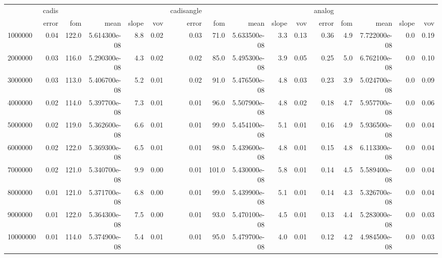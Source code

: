 \begin{tabular}{lrrrrrrrrrrrrrrr}
\toprule
{} & cadis &       &               &       &      & cadisangle &       &               &       &      & analog &     &               &       &      \\
{} & error &   fom &          mean & slope &  vov &      error &   fom &          mean & slope &  vov &  error & fom &          mean & slope &  vov \\
\midrule
1000000  &  0.04 & 122.0 &  5.614300e-08 &   8.8 & 0.02 &       0.03 &  71.0 &  5.633500e-08 &   3.3 & 0.13 &   0.36 & 4.9 &  7.722000e-08 &   0.0 & 0.19 \\
2000000  &  0.03 & 116.0 &  5.290300e-08 &   4.3 & 0.02 &       0.02 &  85.0 &  5.495300e-08 &   3.9 & 0.05 &   0.25 & 5.0 &  6.762100e-08 &   0.0 & 0.10 \\
3000000  &  0.03 & 113.0 &  5.406700e-08 &   5.2 & 0.01 &       0.02 &  91.0 &  5.476500e-08 &   4.8 & 0.03 &   0.23 & 3.9 &  5.024700e-08 &   0.0 & 0.09 \\
4000000  &  0.02 & 114.0 &  5.397700e-08 &   7.3 & 0.01 &       0.01 &  96.0 &  5.507900e-08 &   4.8 & 0.02 &   0.18 & 4.7 &  5.957700e-08 &   0.0 & 0.06 \\
5000000  &  0.02 & 119.0 &  5.362600e-08 &   6.6 & 0.01 &       0.01 &  99.0 &  5.454100e-08 &   5.1 & 0.01 &   0.16 & 4.9 &  5.936500e-08 &   0.0 & 0.04 \\
6000000  &  0.02 & 122.0 &  5.369300e-08 &   6.5 & 0.01 &       0.01 &  98.0 &  5.439600e-08 &   4.8 & 0.01 &   0.15 & 4.8 &  6.113300e-08 &   0.0 & 0.04 \\
7000000  &  0.02 & 121.0 &  5.340700e-08 &   9.9 & 0.00 &       0.01 & 101.0 &  5.430000e-08 &   5.8 & 0.01 &   0.14 & 4.5 &  5.589400e-08 &   0.0 & 0.04 \\
8000000  &  0.01 & 121.0 &  5.371700e-08 &   6.8 & 0.00 &       0.01 &  99.0 &  5.439900e-08 &   5.1 & 0.01 &   0.14 & 4.3 &  5.326700e-08 &   0.0 & 0.04 \\
9000000  &  0.01 & 122.0 &  5.364300e-08 &   7.5 & 0.00 &       0.01 &  93.0 &  5.470100e-08 &   4.5 & 0.01 &   0.13 & 4.4 &  5.283000e-08 &   0.0 & 0.03 \\
10000000 &  0.01 & 114.0 &  5.374900e-08 &   5.4 & 0.01 &       0.01 &  95.0 &  5.479700e-08 &   4.0 & 0.01 &   0.12 & 4.2 &  4.984500e-08 &   0.0 & 0.03 \\
\bottomrule
\end{tabular}
